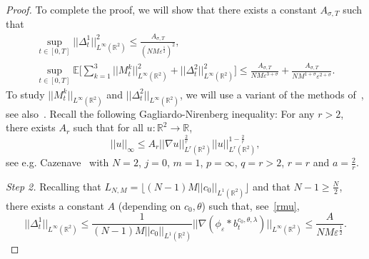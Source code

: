 \documentclass[11pt]{article}
\newcommand{\E}{\mathbb{E}}
\newcommand{\R}{\mathbb{R}}
\newcommand{\1}{\mathbbm{1}}
\newcommand{\e}{\varepsilon}
\newcommand{\vip}{\vskip5pt}
\begin{document}
\begin{proof}
To complete the proof, we will show that there exists a constant
$A_{\sigma,T}$ such that
\begin{gather*}
\sup_{t\in [0,T]} ||\Delta^1_t||_{L^\infty(\R^2)}^2 \leq \frac{A_{\sigma,T}}{(NM\e^{\frac12})^2},\\
\sup_{t\in[0,T]}\E\Big[\sum_{k=1}^3||M^k_t||_{L^\infty(\R^2)}^2+||\Delta^2_t||_{L^\infty(\R^2)}^2\Big]
\leq \frac{A_{\sigma,T}}{NM\e^{3+\sigma}}+  \frac{A_{\sigma,T}}{NM^{1+\sigma}\e^{2+\sigma}} .
\end{gather*}
To study $||M^k_t||_{L^\infty(\R^2)}$ and $||\Delta^2_t||_{L^\infty(\R^2)}$, we will use a variant of the methods of~\cite{ORT}, see also~\cite{CRT}. Recall the following Gagliardo-Nirenberg inequality: 
For any $r>2$, there exists $A_r$ such that for all $u:\R^2 \to \R$,
\begin{equation}\label{gn}
||u||_\infty \leq A_r ||\nabla u||_{L^r(\R^2)}^{\frac 2 r}||u||_{L^r(\R^2)}^{1-\frac 2 r},
\end{equation}
see e.g. Cazenave~\cite[Theorem~1.3.7]{Caz}
with $N=2$, $j=0$, $m=1$, $p=\infty$, $q=r>2$, $r=r$ and $a=\frac 2 r$.
\vip

{\it Step 2.} Recalling that $L_{N,M}=\lfloor (N-1)M||c_0||_{L^1(\R^2)}\rfloor$ and that
$N-1\geq \frac N2$, there exists a constant $A$ (depending on $c_0,\theta$) such that, see~\eqref{rmu},
$$
||\Delta_t^1||_{L^\infty(\R^2)}\leq \frac{1}{(N-1)M||c_0||_{L^1(\R^2)}} 
||\nabla(\phi_\e \ast b_t^{c_0,\theta,\lambda})||_{L^\infty(\R^2)} \leq 
\frac{A}{NM\e^{\frac 1 2}}.
$$

\vip


\end{proof}
\end{document}
